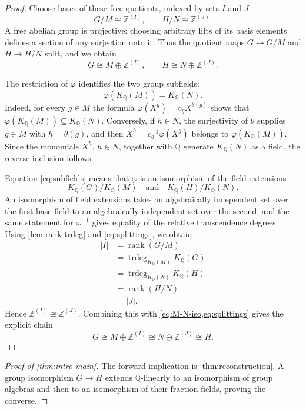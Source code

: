 \documentclass[11pt,a4paper]{article}
\numberwithin{equation}{section}
\theoremstyle{plain}
\theoremstyle{definition}
\theoremstyle{remark}
\newcommand{\Q}{\mathbb Q}
\newcommand{\Z}{\mathbb Z}
\newcommand{\trdeg}{\operatorname{trdeg}}
\newcommand{\rk}{\operatorname{rank}}
\newcommand{\KQ}[1]{K_{\Q}(#1)}
\newcommand{\mon}[1]{X^{#1}}
\begin{document}
\begin{proof}
Choose bases of these free quotients, indexed by sets $I$ and $J$:
\[
  G/M\cong\Z^{(I)},\qquad H/N\cong\Z^{(J)}.
\]
A free abelian group is projective: choosing arbitrary lifts of its basis
elements defines a section of any surjection onto it.  Thus the quotient
maps $G\to G/M$ and $H\to H/N$ split, and we obtain
\begin{equation}\label{eq:splittings}
  G\cong M\oplus\Z^{(I)},
  \qquad
  H\cong N\oplus\Z^{(J)}.
\end{equation}

The restriction of $\varphi$ identifies the two group subfields:
\begin{equation}\label{eq:subfields}
  \varphi(\KQ M)=\KQ N.
\end{equation}
Indeed, for every $g\in M$ the formula
$\varphi(\mon g)=c_g\mon{\theta(g)}$ shows that
$\varphi(\KQ M)\subseteq\KQ N$.  Conversely, if $h\in N$, the surjectivity
of $\theta$ supplies $g\in M$ with $h=\theta(g)$, and then
$\mon h=c_g^{-1}\varphi(\mon g)$ belongs to $\varphi(\KQ M)$.  Since the
monomials $X^h$, $h\in N$, together with $\Q$ generate $\KQ N$ as a field,
the reverse inclusion follows.

Equation \cref{eq:subfields} means that $\varphi$ is an isomorphism of the
field extensions
\[
  \KQ G/\KQ M\quad\text{and}\quad\KQ H/\KQ N.
\]
An isomorphism of field extensions takes an algebraically independent set
over the first base field to an algebraically independent set over the
second, and the same statement for $\varphi^{-1}$ gives equality of the
relative transcendence degrees.  Using \cref{lem:rank-trdeg} and
\cref{eq:splittings}, we obtain
\begin{align*}
  |I|
  &=\rk(G/M)\\
  &=\trdeg_{\KQ M}\KQ G\\
  &=\trdeg_{\KQ N}\KQ H\\
  &=\rk(H/N)\\
  &=|J|.
\end{align*}
Hence $\Z^{(I)}\cong\Z^{(J)}$.  Combining this with
\cref{eq:M-N-iso,eq:splittings} gives the explicit chain
\[
  G\cong M\oplus\Z^{(I)}
  \cong N\oplus\Z^{(J)}
  \cong H.
\]
\end{proof}

\begin{proof}[Proof of \cref{thm:intro-main}]
The forward implication is \cref{thm:reconstruction}.  A group isomorphism
$G\to H$ extends $\Q$-linearly to an isomorphism of group algebras and then
to an isomorphism of their fraction fields, proving the converse.
\end{proof}
\end{document}
